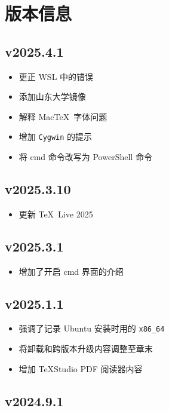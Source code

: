 
\chapter{版本信息}

\section*{v2025.4.1}

\begin{itemize}
  \item 更正 WSL 中的错误
  \item 添加山东大学镜像
  \item 解释 Mac\TeX\ 字体问题
  \item 增加 \texttt{Cygwin} 的提示
  \item 将 \textsf{cmd} 命令改写为 \textsf{PowerShell} 命令
\end{itemize}

\section*{v2025.3.10}

\begin{itemize}
  \item 更新 \TeX\ Live 2025
\end{itemize}

\section*{v2025.3.1}

\begin{itemize}
  \item 增加了开启 \textsf{cmd} 界面的介绍
\end{itemize}

\section*{v2025.1.1}

\begin{itemize}
  \item 强调了记录 Ubuntu 安装时用的 \texttt{x86\_64}
  \item 将卸载和跨版本升级内容调整至章末
  \item 增加 \TeX Studio PDF 阅读器内容
\end{itemize}

\section*{v2024.9.1}


